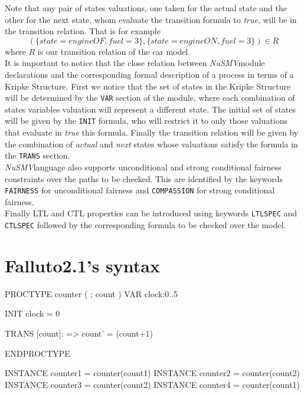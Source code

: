 \documentclass[12pt]{article}
\newcommand{\nusmv}{\mbox{\textit{NuSMV}}}
\begin{document}
Note that any pair of states valuations, one taken for the actual state and the
other for the next state, whom evaluate the transition formula to \emph{true},
will be in the transition relation. That is for example
$$(\{state=engineOF, fuel=3\},\{state=engineON,fuel=3\}) \in R$$ where $R$ is our
transition relation of the car model.\\
It is important to notice that the close relation between \nusmv module declarations and the corresponding formal description of a process in terms of a Kripke Structure. First we notice that the set of states in the Kripke Structure will be determined by the \texttt{VAR} section of the module, where each combination of states variables valuation will represent a different state. The initial set of states will be given by the \texttt{INIT} formula, who will restrict it to only those valuations that evaluate in \textit{true} this formula. Finally the transition relation will be given by the combination of \textit{actual} and \textit{next} states whose valuations satisfy the formula in the \texttt{TRANS} section.\\
\nusmv language also supports unconditional and strong conditional fairness constraints over the paths to be checked. This are identified by the keywords \texttt{FAIRNESS} for unconditional fairness and \texttt{COMPASSION} for strong conditional fairness.\\
Finally LTL and CTL properties can be introduced using keywords \texttt{LTLSPEC} and \texttt{CTLSPEC} followed by the corresponding formula to be checked over the model.




\section{Falluto2.1's syntax}

\begin{verbbox}
PROCTYPE counter ( ; count )
    VAR
        clock:0..5

    INIT
        clock = 0

    TRANS
        [count]: => count' = (count+1)%

ENDPROCTYPE

INSTANCE counter1 = counter(count1)
INSTANCE counter2 = counter(count2)
INSTANCE counter3 = counter(count2)
INSTANCE counter4 = counter(count1)

\end{verbbox}
\end{document}

